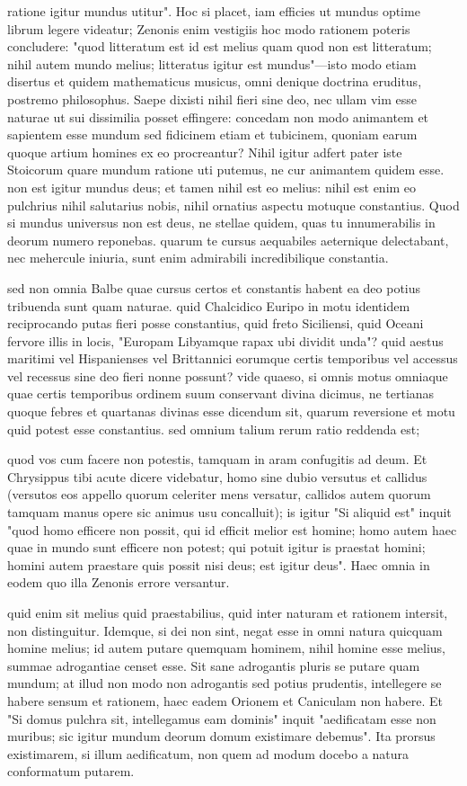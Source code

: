  ratione igitur mundus utitur". Hoc si placet, iam efficies ut mundus optime librum legere videatur; Zenonis enim vestigiis hoc modo rationem poteris concludere: "quod litteratum est id est melius quam quod non est litteratum; nihil autem mundo melius; litteratus igitur est mundus"—isto modo etiam disertus et quidem mathematicus musicus, omni denique doctrina eruditus, postremo philosophus. Saepe dixisti nihil fieri sine deo, nec ullam vim esse naturae ut sui dissimilia posset effingere: concedam non modo animantem et sapientem esse mundum sed fidicinem etiam et tubicinem, quoniam earum quoque artium homines ex eo procreantur? Nihil igitur adfert pater iste Stoicorum quare mundum ratione uti putemus, ne cur animantem quidem esse. non est igitur mundus deus; et tamen nihil est eo melius: nihil est enim eo pulchrius nihil salutarius nobis, nihil ornatius aspectu motuque constantius. Quod si mundus universus non est deus, ne stellae quidem, quas tu innumerabilis in deorum numero reponebas. quarum te cursus aequabiles aeternique delectabant, nec mehercule iniuria, sunt enim admirabili incredibilique constantia.

 sed non omnia Balbe quae cursus certos et constantis habent ea deo potius tribuenda sunt quam naturae. quid Chalcidico Euripo in motu identidem reciprocando putas fieri posse constantius, quid freto Siciliensi, quid Oceani fervore illis in locis, "Europam Libyamque rapax ubi dividit unda"? quid aestus maritimi vel Hispanienses vel Brittannici eorumque certis temporibus vel accessus vel recessus sine deo fieri nonne possunt? vide quaeso, si omnis motus omniaque quae certis temporibus ordinem suum conservant divina dicimus, ne tertianas quoque febres et quartanas divinas esse dicendum sit, quarum reversione et motu quid potest esse constantius. sed omnium talium rerum ratio reddenda est;

 quod vos cum facere non potestis, tamquam in aram confugitis ad deum. Et Chrysippus tibi acute dicere videbatur, homo sine dubio versutus et callidus (versutos eos appello quorum celeriter mens versatur, callidos autem quorum tamquam manus opere sic animus usu concalluit); is igitur "Si aliquid est" inquit "quod homo efficere non possit, qui id efficit melior est homine; homo autem haec quae in mundo sunt efficere non potest; qui potuit igitur is praestat homini; homini autem praestare quis possit nisi deus; est igitur deus". Haec omnia in eodem quo illa Zenonis errore versantur.

 quid enim sit melius quid praestabilius, quid inter naturam et rationem intersit, non distinguitur. Idemque, si dei non sint, negat esse in omni natura quicquam homine melius; id autem putare quemquam hominem, nihil homine esse melius, summae adrogantiae censet esse. Sit sane adrogantis pluris se putare quam mundum; at illud non modo non adrogantis sed potius prudentis, intellegere se habere sensum et rationem, haec eadem Orionem et Caniculam non habere. Et "Si domus pulchra sit, intellegamus eam dominis" inquit "aedificatam esse non muribus; sic igitur mundum deorum domum existimare debemus". Ita prorsus existimarem, si illum aedificatum, non quem ad modum docebo a natura conformatum putarem.

